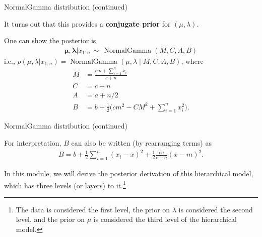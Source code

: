 \documentclass[
  ignorenonframetext,
]{beamer}
\DeclareMathOperator*{\NormalGamma}{NormalGamma}
\begin{document}
\begin{frame}{NormalGamma distribution (continued)}
\protect\hypertarget{normalgamma-distribution-continued}{}

It turns out that this provides a \textbf{conjugate prior} for
\((\mu,\lambda)\).

One can show the posterior is
\begin{align}\label{equation:NormalGamma-posterior}
\bm\mu,\bm\lambda|x_{1:n}\,\sim\,\NormalGamma(M,C,A,B)
\end{align} i.e.,
\(p(\mu,\lambda|x_{1:n}) =\NormalGamma(\mu,\lambda\mid M,C,A,B)\), where
\begin{align*}
    M & =\frac{c m +\sum_{i=1}^n x_i}{c + n}\\
    C & = c + n\\
    A & = a + n/2\\
    B & = b +\tfrac{1}{2}\big(c m^2-C M^2+\textstyle\sum_{i=1}^n x_i^2\big).
\end{align*}

\end{frame}

\begin{frame}{NormalGamma distribution (continued)}
\protect\hypertarget{normalgamma-distribution-continued-1}{}

For interpretation, \(B\) can also be written (by rearranging terms) as
\begin{align}\label{equation:B}
B = b + \frac{1}{2}\sum_{i=1}^n (x_i-\bar x)^2 + \frac{1}{2}\frac{c n}{c + n}(\bar x - m)^2.
\end{align}

In this module, we will derive the posterior derivation of this
hierarchical model, which has three levels (or layers) to
it.\footnote{The data is considered the first level, the prior on $\lambda$ is considered the second level, and the prior on $\mu$ is considered the third level of the hierarchical model.}

\end{frame}
\end{document}
